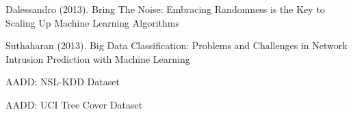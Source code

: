 \documentclass[twoside]{article}
\begin{document}
\begin{multicols}{2}
\begin{thebibliography}{99}
Dalessandro (2013). Bring The Noise: Embracing Randomness is the Key to Scaling Up Machine Learning Algorithms

Suthaharan (2013). Big Data Classification: Problems and Challenges in Network Intrusion Prediction with Machine Learning

\bibitem[3] AADD: NSL-KDD Dataset

\bibitem[4] AADD: UCI Tree Cover Dataset
 
\end{thebibliography}


\end{multicols}
\end{document}
